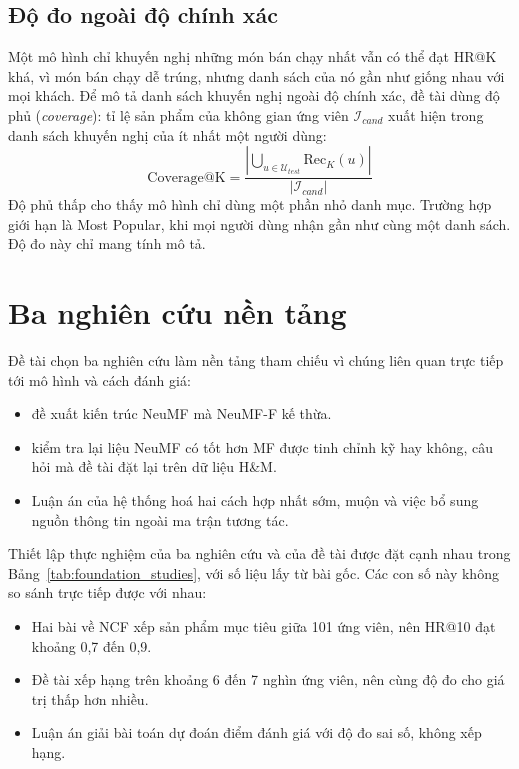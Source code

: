 \subsection{Độ đo ngoài độ chính xác}
\label{subsec:beyond_accuracy}

Một mô hình chỉ khuyến nghị những món bán chạy nhất vẫn có thể đạt HR@K khá, vì món bán chạy dễ trúng, nhưng danh sách của nó gần như giống nhau với mọi khách. Để mô tả danh sách khuyến nghị ngoài độ chính xác, đề tài dùng độ phủ (\textit{coverage}): tỉ lệ sản phẩm của không gian ứng viên $\mathcal{I}_{cand}$ xuất hiện trong danh sách khuyến nghị của ít nhất một người dùng:
\begin{equation*}
    \text{Coverage@K} = \frac{\left| \bigcup_{u \in \mathcal{U}_{test}} \text{Rec}_K(u) \right|}{|\mathcal{I}_{cand}|}
\end{equation*}
Độ phủ thấp cho thấy mô hình chỉ dùng một phần nhỏ danh mục. Trường hợp giới hạn là Most Popular, khi mọi người dùng nhận gần như cùng một danh sách. Độ đo này chỉ mang tính mô tả.

\section{Ba nghiên cứu nền tảng}
\label{sec:related_work}
\label{subsec:foundation_studies}

Đề tài chọn ba nghiên cứu làm nền tảng tham chiếu vì chúng liên quan trực tiếp tới mô hình và cách đánh giá:
\begin{itemize}
    \item \textcite{he2017ncf} đề xuất kiến trúc NeuMF mà NeuMF-F kế thừa.
    \item \textcite{rendle2020ncfmf} kiểm tra lại liệu NeuMF có tốt hơn MF được tinh chỉnh kỹ hay không, câu hỏi mà đề tài đặt lại trên dữ liệu H\&M.
    \item Luận án của \textcite{holinh2023multisource} hệ thống hoá hai cách hợp nhất sớm, muộn và việc bổ sung nguồn thông tin ngoài ma trận tương tác.
\end{itemize}

Thiết lập thực nghiệm của ba nghiên cứu và của đề tài được đặt cạnh nhau trong Bảng~\ref{tab:foundation_studies}, với số liệu lấy từ bài gốc. Các con số này không so sánh trực tiếp được với nhau:
\begin{itemize}
    \item Hai bài về NCF xếp sản phẩm mục tiêu giữa 101 ứng viên, nên HR@10 đạt khoảng 0,7 đến 0,9.
    \item Đề tài xếp hạng trên khoảng 6 đến 7 nghìn ứng viên, nên cùng độ đo cho giá trị thấp hơn nhiều.
    \item Luận án giải bài toán dự đoán điểm đánh giá với độ đo sai số, không xếp hạng.
\end{itemize}

